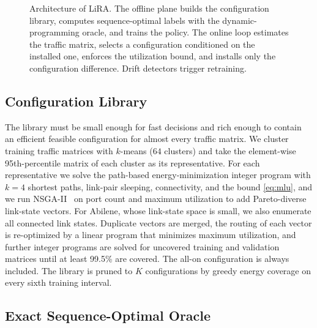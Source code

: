 \documentclass[journal]{IEEEtran}
\begin{document}
\begin{figure}[t]
{}
\caption{Architecture of LiRA. The offline plane builds the configuration library, computes sequence-optimal labels with the dynamic-programming oracle, and trains the policy. The online loop estimates the traffic matrix, selects a configuration conditioned on the installed one, enforces the utilization bound, and installs only the configuration difference. Drift detectors trigger retraining.}
\label{fig:arch}
\end{figure}

\subsection{Configuration Library}\label{sec:library}

The library must be small enough for fast decisions and rich enough to contain an efficient feasible configuration for almost every traffic matrix. We cluster training traffic matrices with $k$-means ($64$ clusters) and take the element-wise 95th-percentile matrix of each cluster as its representative. For each representative we solve the path-based energy-minimization integer program with $k=4$ shortest paths, link-pair sleeping, connectivity, and the bound \eqref{eq:mlu}, and we run NSGA-II~\cite{deb2002nsga2} on port count and maximum utilization to add Pareto-diverse link-state vectors. For Abilene, whose link-state space is small, we also enumerate all connected link states. Duplicate vectors are merged, the routing of each vector is re-optimized by a linear program that minimizes maximum utilization, and further integer programs are solved for uncovered training and validation matrices until at least 99.5\% are covered. The all-on configuration is always included. The library is pruned to $K$ configurations by greedy energy coverage on every sixth training interval.

\subsection{Exact Sequence-Optimal Oracle}
\end{document}
